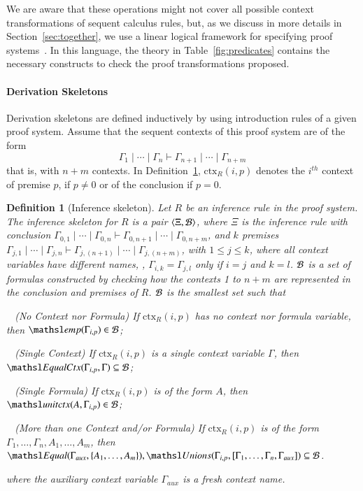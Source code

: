 \documentclass{new_tlp}
\newcommand{\elin}[2]{\ensuremath{{\tsl{unitctx}(\ensuremath{#1}, \ensuremath{#2})}}}
\newcommand{\emp}[1]{\ensuremath{{\tsl{emp}(\ensuremath{#1})}}}
\newcommand{\unions}[2]{\ensuremath{\tsl{Unions}(\ensuremath{#1},\ensuremath{#2})}}
\newcommand{\equal}[2]{\ensuremath{\tsl{Equal}(\ensuremath{#1},\ensuremath{#2})}}
\newcommand{\equalCtx}[2]{\ensuremath{\tsl{EqualCtx}(\ensuremath{#1},\ensuremath{#2})}}
\newtheorem{definition}[theorem]{Definition}
\begin{document}
We are aware that these operations might not cover all possible context
transformations of sequent calculus rules, but,
as we discuss in more details in Section~\ref{sec:together}, we use a linear logical framework
for specifying proof systems~\cite{nigam11lsfa}. In this language, the theory in Table~\ref{fig:predicates} 
contains the necessary constructs to check the proof transformations proposed.

\paragraph{Derivation Skeletons} 
Derivation skeletons are defined inductively by using introduction rules of a given 
proof system. Assume that the sequent contexts of this proof system are of the 
form 
\[
\Gamma_1  \mid \cdots \mid \Gamma_n \vdash \Gamma_{n+1} \mid \cdots \mid \Gamma_{n + m}
\]
that is, with $n + m$ contexts. 
\newcommand\ctx[2]{\ensuremath{\textrm{ctx}_R(#1,#2)}}
In Definition~\ref{def:inference-skeleton}, $\ctx{i}{p}$ denotes the $i^{th}$
context of premise $p$, if $p \neq 0$ or of the conclusion if $p=0$.

\begin{definition}[Inference skeleton]
\label{def:inference-skeleton}
Let $R$ be an inference rule in the proof system. 
The \emph{inference skeleton} for $R$ is a pair $\tup{\Xi, \Bscr}$, 
where $\Xi$ is the inference rule 
with conclusion $\Gamma_{0,1}  \mid \cdots \mid \Gamma_{0,n} \vdash 
\Gamma_{0,n+1} \mid \cdots \mid \Gamma_{0,n + m}$, and $k$ premises 
$\Gamma_{j,1}  \mid \cdots \mid \Gamma_{j,n} \vdash \Gamma_{j,(n+1)} \mid \cdots \mid \Gamma_{j,(n+m)}$, 
with $1 \leq j \leq k$, where all context variables have different names, \ie, 
$\Gamma_{i,k} = \Gamma_{j,l}$ only if $i = j$ and $k = l$.
$\Bscr$ is a set of formulas constructed by checking 
how the contexts 1 to $n+m$ are represented in the conclusion and premises of
$R$. 
$\Bscr$ is the smallest set such that

\noindent
\textbullet~ (No Context nor Formula) If $\ctx{i}{p}$ has no context nor formula variable, then $\emp{\Gamma_{i,p}} \in \Bscr$;

\noindent
\textbullet~ (Single Context) If $\ctx{i}{p}$ is a single context variable $\Gamma$, then $\equalCtx{\Gamma_{i,p}}{\Gamma} \subseteq \Bscr$;

\noindent
\textbullet~ (Single Formula) If $\ctx{i}{p}$ is of the form $A$, then $\elin{A}{\Gamma_{i,p}} \in \Bscr$;

\noindent
\textbullet~ (More than one Context and/or Formula) If $\ctx{i}{p}$ is of the form $\Gamma_1, \ldots, \Gamma_n, A_1, \ldots, A_m$, 
 then $\equal{\Gamma_{aux}}{\{A_1, \ldots, A_m\}}, \unions{\Gamma_{i,p}}{[\Gamma_1, \ldots, \Gamma_n, 
 \Gamma_{aux}]} \subseteq \Bscr$.

 \noindent
where the auxiliary context variable $\Gamma_{aux}$ is a fresh context name. 
\end{definition}
\end{document}
